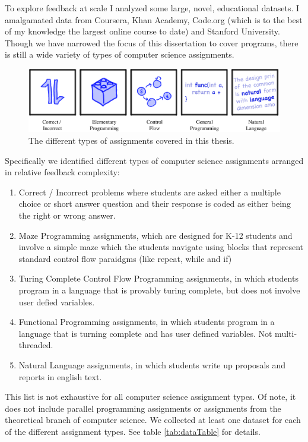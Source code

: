 To explore feedback at scale I analyzed some large, novel, educational
datasets. I amalgamated data from Coursera, Khan Academy, Code.org (which is to the
best of my knowledge the largest online course to date) and Stanford University. Though we have narrowed the focus of this dissertation to cover programs, there is still a wide variety of types of computer science assignments. 

\begin{figure}[h]
\center
\includegraphics[width=1.0\textwidth]{img/assnType_all}
\caption[Assignment types]{
The different types of assignments covered in this thesis.
\label{fig:assnTypes}
}
\end{figure}

Specifically we identified different types of computer science assignments arranged in relative feedback complexity: 
\begin{enumerate}
\item Correct / Incorrect problems where students are asked either a multiple choice or short answer question and their response is coded as either being the right or wrong answer. 
\item Maze Programming assignments, which are designed for K-12 students and involve a simple maze which the students navigate using blocks that represent standard control flow paraidgms (like repeat, while and if)
\item Turing Complete Control Flow Programming assignments, in which students program in a language that is provably turing complete, but does not involve user defied variables.
\item Functional Programming assignments, in which students program in a language that is turning complete and has user defined variables. Not multi-threaded.
\item Natural Language assignments, in which students write up proposals and reports in english text.	
\end{enumerate}

This list is not exhaustive for all computer science assignment types. Of note, it does not include parallel programming assignments or assignments from the theoretical branch of computer science. We collected at least one dataset for each of the different assignment types. See table \ref{tab:dataTable} for details. 

